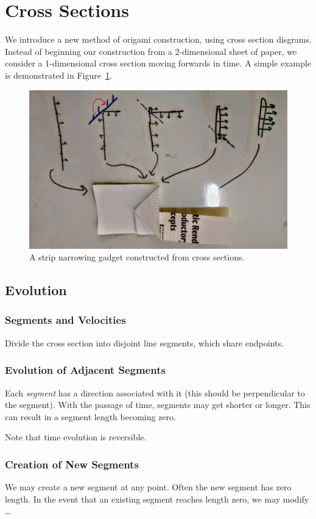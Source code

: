 \section{Cross Sections}
\label{sec:cross_sections}

We introduce a new method of origami construction, using cross section disgrams.
Instead of beginning our construction from a 2-dimensional sheet of paper,
we consider a 1-dimensional cross section moving forwards in time.
A simple example is demonstrated in Figure~\ref{fig:strip_narrowing}.
\begin{figure}[htpb]
    \centering
    \includegraphics[width=0.8\linewidth]{figures/strip_narrowing.jpg}
    \caption{A strip narrowing gadget constructed from cross sections.}
    \label{fig:strip_narrowing}
\end{figure}

\subsection{Evolution}
\label{sec:evolution}

\subsubsection*{Segments and Velocities}
\label{sec:segments_and_velocities}
Divide the cross section into disjoint line segments, which share endpoints.

\subsubsection*{Evolution of Adjacent Segments}
\label{sec:evolution_of_adjacent_segments}
Each \emph{segment} has a direction associated with it (this should be perpendicular to the segment).
With the passage of time, segments may get shorter or longer.
This can result in a segment length becoming zero.

Note that time evolution is reversible.

\subsubsection*{Creation of New Segments}
\label{sec:creation_of_new_segments}
We may create a new segment at any point. Often the new segment has zero length.
In the event that an existing segment reaches length zero, we may modify \ldots

